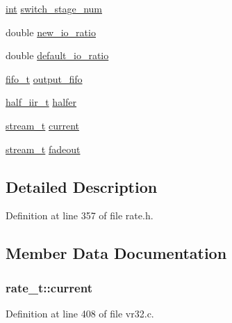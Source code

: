 \begin{DoxyCompactItemize}
\item 
\hyperlink{xmltok_8h_a5a0d4a5641ce434f1d23533f2b2e6653}{int} \hyperlink{structrate__t_a1aa5eb8fe632a379bb71293828a28291}{switch\+\_\+stage\+\_\+num}
\item 
double \hyperlink{structrate__t_ab5e0424ac7aa7763f539a80a39296e64}{new\+\_\+io\+\_\+ratio}
\item 
double \hyperlink{structrate__t_afd9c541a319b96c473f2e0ba5b1911ce}{default\+\_\+io\+\_\+ratio}
\item 
\hyperlink{structfifo__t}{fifo\+\_\+t} \hyperlink{structrate__t_a22052d997b08dc733094f6589f7c2d64}{output\+\_\+fifo}
\item 
\hyperlink{structhalf__iir__t}{half\+\_\+iir\+\_\+t} \hyperlink{structrate__t_a03e79fd9212758b1d773b487a1f66f63}{halfer}
\item 
\hyperlink{structstream__t}{stream\+\_\+t} \hyperlink{structrate__t_a0ca735eb964e40bd4964bf63f4eb29bb}{current}
\item 
\hyperlink{structstream__t}{stream\+\_\+t} \hyperlink{structrate__t_a4aa7fd5873f75a6b6aa7222c0e977e2f}{fadeout}
\end{DoxyCompactItemize}


\subsection{Detailed Description}


Definition at line 357 of file rate.\+h.



\subsection{Member Data Documentation}
\subsubsection[{\texorpdfstring{current}{current}}]{ rate\+\_\+t\+::current}\hypertarget{structrate__t_a0ca735eb964e40bd4964bf63f4eb29bb}{}\label{structrate__t_a0ca735eb964e40bd4964bf63f4eb29bb}


Definition at line 408 of file vr32.\+c.

